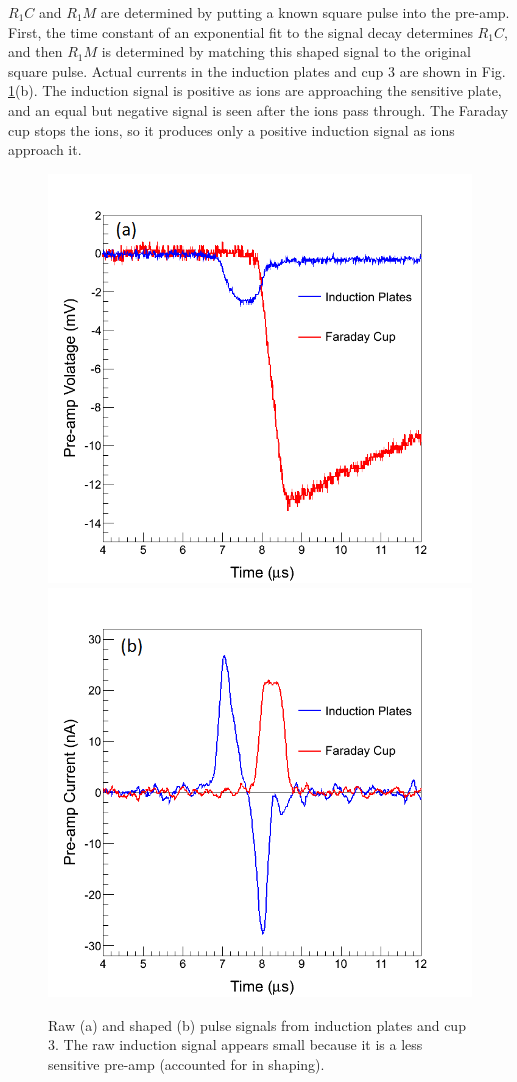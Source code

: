 \noindent
$R_{1} C$ and $R_{1} M$ are determined by putting a known square pulse into the pre-amp.  First, the time constant of an exponential fit to the signal decay determines $R_{1} C$, and then $R_{1} M$ is determined by matching this shaped signal to the original square pulse.  Actual currents in the induction plates and cup 3 are shown in Fig. \ref{fig:pulse_raw_shaped}(b).  The induction signal is positive as ions are approaching the sensitive plate, and an equal but negative signal is seen after the ions pass through.  The Faraday cup stops the ions, so it produces only a positive induction signal as ions approach it.

\begin{figure} %
                \includegraphics[width=.49\textwidth]{figures/pulse_ind_cup3_raw.png}
                \includegraphics[width=.49\textwidth]{figures/pulse_ind_cup3_shaped.png}
                \caption{Raw (a) and shaped (b) pulse signals from induction plates and cup 3.  The raw induction signal appears small because it is a less sensitive pre-amp (accounted for in shaping).}
        \label{fig:pulse_raw_shaped}
\end{figure}

